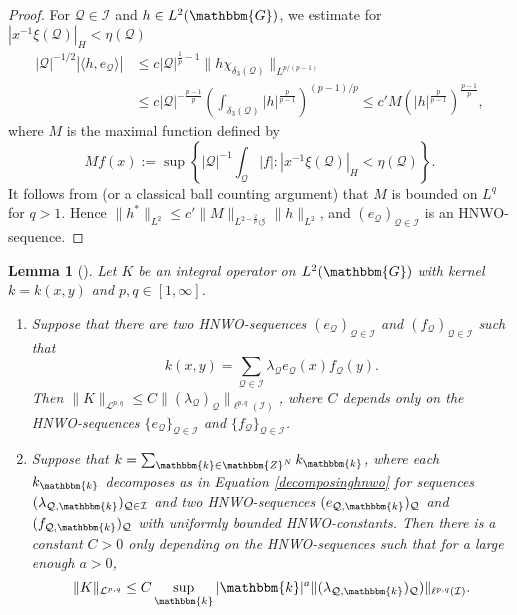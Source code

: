 \documentclass[10pt]{amsart}
\newtheorem{lem}[thm]{Lemma}
\theoremstyle{remark}
\theoremstyle{definition}
\begin{document}
\begin{proof}
For $\mathcal{Q}\in \mathcal{I}$ and $h\in L^2(\mathbbm{G})$, we estimate for $|x^{-1}\xi(\mathcal{Q})|_H<\eta(\mathcal{Q})$
\begin{align*}
|\mathcal{Q}|^{-1/2} |\langle h, e_\mathcal{Q}\rangle|&\leq c|\mathcal{Q}|^{\frac{1}{p}-1}\|h \chi_{\delta_3(\mathcal{Q})}\|_{L^{p/(p-1)}}\\
&\leq c |\mathcal{Q}|^{-\frac{p-1}{p}}\left(\int_{\delta_3(\mathcal{Q})} |h|^{\frac{p}{p-1}}\right)^{(p-1)/p}\leq c' M(|h|^{\frac{p}{p-1}})^{\frac{p-1}{p}},
\end{align*}
where $M$ is the maximal function defined by 
$$Mf(x):=\sup\left\{ |\mathcal{Q}|^{-1} \int_{\mathcal{Q}} |f|: |x^{-1}\xi(\mathcal{Q})|_H<\eta(\mathcal{Q})\right\}.$$
It follows from \cite[Theorem 2.4.b]{follandstein} (or a classical ball counting argument) that $M$ is bounded on $L^q$ for $q>1$. Hence $\|h^*\|_{L^2}\leq c'\|M\|_{L^{2-\frac{2}{p}}\circlearrowleft}\|h\|_{L^2}$, and $(e_\mathcal{Q})_{\mathcal{Q}\in \mathcal{I}}$ is an HNWO-sequence.
\end{proof}

\begin{lem}[\cite{rochbergsemmes}]
Let $K$ be an integral operator on $L^2(\mathbbm{G})$ with kernel $k=k(x,y)$ and $p,q\in [1,\infty]$.
\begin{enumerate}
\item Suppose that there are two HNWO-sequences $(e_\mathcal{Q})_{\mathcal{Q}\in \mathcal{I}}$ and $(f_\mathcal{Q})_{\mathcal{Q}\in \mathcal{I}}$ such that 
\begin{equation}
\label{decomposinghnwo}
k(x,y)=\sum_{\mathcal{Q}\in \mathcal{I}} \lambda_\mathcal{Q} e_\mathcal{Q}(x)f_\mathcal{Q}(y).
\end{equation}
Then $\|K\|_{\mathcal{L}^{p,q}}\leq C\|(\lambda_\mathcal{Q})_{\mathcal{Q}}\|_{\ell^{p,q}(\mathcal{I})}$, where $C$ depends only on the HNWO-sequences $\{e_\mathcal{Q}\}_{\mathcal{Q}\in \mathcal{I}}$ and $\{f_\mathcal{Q}\}_{\mathcal{Q}\in \mathcal{I}}$.
\item Suppose that $k=\sum_{\mathbbm{k}\in {\mathbbm{Z}}^N} k_{\mathbbm{k}}$, where each $k_{\mathbbm{k}}$ decomposes as in Equation \eqref{decomposinghnwo} for sequences $(\lambda_{\mathcal{Q},\mathbbm{k}})_{\mathcal{Q}\in \mathcal{I}}$ and two HNWO-sequences $(e_{\mathcal{Q},\mathbbm{k}})_{\mathcal{Q}}$ and $(f_{\mathcal{Q},\mathbbm{k}})_{\mathcal{Q}}$ with uniformly bounded HNWO-constants. Then there is a constant $C>0$ only depending on the HNWO-sequences such that for a large enough $a>0$, 
$$\|K\|_{\mathcal{L}^{p,q}}\leq C\sup_{\mathbbm{k}} |\mathbbm{k}|^a\|(\lambda_{\mathcal{Q},\mathbbm{k}})_\mathcal{Q})\|_{\ell^{p,q}(\mathcal{I})}.$$
\end{enumerate}
\end{lem}
\end{document}
